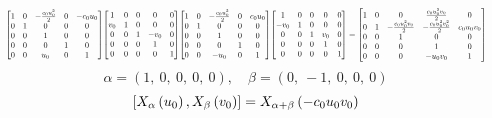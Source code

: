 \documentclass[11pt]{article}
\theoremstyle{definition}
\begin{document}
\[
\scaletoalign{\textwidth}{{\left[\begin{matrix}1 & 0 & - \frac{c_{0} u_{0}^{2}}{2} & 0 & - c_{0} u_{0}\\0 & 1 & 0 & 0 & 0\\0 & 0 & 1 & 0 & 0\\0 & 0 & 0 & 1 & 0\\0 & 0 & u_{0} & 0 & 1\end{matrix}\right]} {\left[\begin{matrix}1 & 0 & 0 & 0 & 0\\v_{0} & 1 & 0 & 0 & 0\\0 & 0 & 1 & - v_{0} & 0\\0 & 0 & 0 & 1 & 0\\0 & 0 & 0 & 0 & 1\end{matrix}\right]} {\left[\begin{matrix}1 & 0 & - \frac{c_{0} u_{0}^{2}}{2} & 0 & c_{0} u_{0}\\0 & 1 & 0 & 0 & 0\\0 & 0 & 1 & 0 & 0\\0 & 0 & 0 & 1 & 0\\0 & 0 & - u_{0} & 0 & 1\end{matrix}\right]} {\left[\begin{matrix}1 & 0 & 0 & 0 & 0\\- v_{0} & 1 & 0 & 0 & 0\\0 & 0 & 1 & v_{0} & 0\\0 & 0 & 0 & 1 & 0\\0 & 0 & 0 & 0 & 1\end{matrix}\right]} = {\left[\begin{matrix}1 & 0 & 0 & \frac{c_{0} u_{0}^{2} v_{0}}{2} & 0\\0 & 1 & - \frac{c_{0} u_{0}^{2} v_{0}}{2} & - \frac{c_{0} u_{0}^{2} v_{0}^{2}}{2} & c_{0} u_{0} v_{0}\\0 & 0 & 1 & 0 & 0\\0 & 0 & 0 & 1 & 0\\0 & 0 & 0 & - u_{0} v_{0} & 1\end{matrix}\right]}}
\]
\[
\alpha = \left( 1, \  0, \  0, \  0, \  0\right), \quad \beta = \left( 0, \  -1, \  0, \  0, \  0\right)
\]
\[
\scaletoalign{\textwidth}{\left[ X_{\alpha}\left(u_{0}\right), X_{\beta}\left(v_{0}\right) \right] = X_{\alpha + \beta}\left(- c_{0} u_{0} v_{0}\right)}
\]
\end{document}
